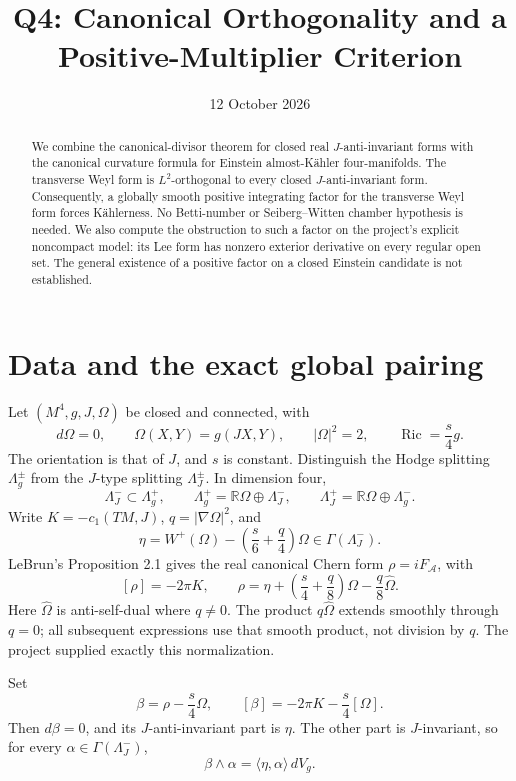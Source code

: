 \documentclass[11pt]{article}
\title{Q4: Canonical Orthogonality and a Positive-Multiplier Criterion}
\author{}
\date{12 October 2026}
\theoremstyle{remark}
\newcommand{\Ric}{\operatorname{Ric}}
\newcommand{\Om}{\Omega}
\newcommand{\dd}{\,dV_g}
\begin{document}
\maketitle
\begin{abstract}
We combine the canonical-divisor theorem for closed real
\(J\)-anti-invariant forms with the canonical curvature formula for
Einstein almost-K\"ahler four-manifolds. The transverse Weyl form is
\(L^2\)-orthogonal to every closed \(J\)-anti-invariant form. Consequently,
a globally smooth positive integrating factor for the transverse Weyl form
forces K\"ahlerness. No Betti-number or Seiberg--Witten chamber hypothesis
is needed. We also compute the obstruction to such a factor on the
project's explicit noncompact model: its Lee form has nonzero exterior
derivative on every regular open set. The general existence of a positive
factor on a closed Einstein candidate is not established.
\end{abstract}

\section{Data and the exact global pairing}
Let \((M^4,g,J,\Om)\) be closed and connected, with
\[
 d\Om=0,\qquad \Om(X,Y)=g(JX,Y),\qquad |\Om|^2=2,\qquad
 \Ric=\frac{s}{4}g.
\]
The orientation is that of \(J\), and \(s\) is constant.
Distinguish the Hodge splitting \(\Lambda_g^\pm\) from the
\(J\)-type splitting \(\Lambda_J^\pm\). In dimension four,
\[
 \Lambda_J^-\subset\Lambda_g^+,\qquad
 \Lambda_g^+=\mathbb R\Om\oplus\Lambda_J^-,
 \qquad
 \Lambda_J^+=\mathbb R\Om\oplus\Lambda_g^-.
\]
Write \(K=-c_1(TM,J)\), \(q=|\nabla\Om|^2\), and
\[
 \eta=W^+(\Om)-\left(\frac{s}{6}+\frac q4\right)\Om
 \in\Gamma(\Lambda_J^-).
\]
LeBrun's Proposition 2.1 \cite{LeBrun} gives the real canonical
Chern form \(\rho=iF_{\mathcal A}\), with
\[
 [\rho]=-2\pi K,\qquad
 \rho=\eta+\left(\frac s4+\frac q8\right)\Om-\frac q8\widehat\Om .
 \tag{1}
\]
Here \(\widehat\Om\) is anti-self-dual where \(q\ne0\).
The product \(q\widehat\Om\) extends smoothly through \(q=0\);
all subsequent expressions use that smooth product, not division by \(q\).
The project supplied exactly this normalization.

Set
\[
 \beta=\rho-\frac{s}{4}\Om,\qquad
 [\beta]=-2\pi K-\frac{s}{4}[\Om].
 \tag{2}
\]
Then \(d\beta=0\), and its \(J\)-anti-invariant part is \(\eta\).
The other part is \(J\)-invariant, so for every
\(\alpha\in\Gamma(\Lambda_J^-)\),
\[
 \beta\wedge\alpha=\langle\eta,\alpha\rangle\dd.
 \tag{3}
\]
\end{document}
